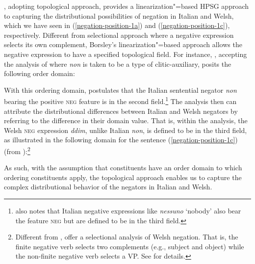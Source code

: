 \documentclass[output=paper
	        ,collection
	        ,collectionchapter
 	        ,biblatex
                ,babelshorthands
                ,newtxmath
                ,draftmode
                ,colorlinks, citecolor=brown
]{langscibook}
\begin{document}
{\begin{exe}
\begin{xlist}
\citet{Borsley:06}, adopting  topological approach,
 provides a linearization"=based HPSG approach to capturing the distributional possibilities of negation in Italian and Welsh, which we have seen
 in (\ref{negation-position-1a}) and (\ref{negation-position-1c}), respectively.
%
%
  Different from  selectional
  approach where a negative expression selects its own complement,
  Borsley's linearization"=based approach allows the negative expression to
   have a specified topological field.
For instance, \citet{Borsley:06}, accepting the analysis of \citet{Kim:00}
where \textit{non} is taken to be a type of clitic-auxiliary, posits the following
order domain:


\ea
{}
\z
%
With this ordering domain, \citet{Borsley:06} postulates
that the Italian sentential negator \emph{non} bearing the positive \textsc{neg} feature is in the second field.\footnote{
\citet{Borsley:06} also notes that Italian negative expressions like \emph{nessuno} `nobody' also bear the feature \textsc{neg}
but are defined to be in the third field.}
The analysis then can attribute the distributional differences between Italian and Welsh negators
by referring to the difference in their domain value. That is,
within the analysis, the Welsh \textsc{neg} expression \emph{ddim}, unlike Italian \emph{non},
is defined to be in the third field, as illustrated in the following domain for the sentence (\ref{negation-position-1c}) (from
\citealt{Borsley:06}):\footnote{Different from \citet{Borsley:06}, \citet{BJ:00} offer  a selectional analysis of Welsh negation.
That is, the finite negative verb selects
two complements (e.g., subject and object) while
the non-finite negative verb selects a VP. See \citet{BJ:00} for details.}

\ea
{}
\z
As such,  with the assumption that
constituents have an order domain to which ordering constituents
apply, the topological approach enables us to capture the complex distributional
behavior of the negators in Italian and Welsh.
%


\end{xlist}
\end{exe}}
\end{document}
